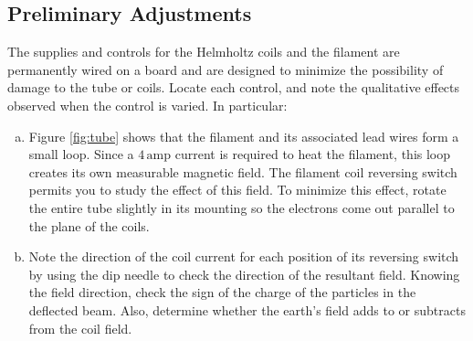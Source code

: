 \subsection{Preliminary Adjustments}
The supplies and controls for the Helmholtz coils and the filament are permanently wired on a board and are designed to minimize the possibility of damage to the tube or coils. Locate each control, and note the qualitative effects observed when the control is varied. In particular:
\begin{enumerate}[(a)]
\item Figure {\ref{fig:tube}} shows that the filament and its associated lead wires form a small loop. Since a $4\,\mathrm{amp}$ current is required to heat the filament, this loop creates its own measurable magnetic field. The filament coil reversing switch permits you to study the effect of this field. To minimize this effect, rotate the entire tube slightly in its mounting so the electrons come out parallel to the plane of the coils.
\item Note the direction of the coil current for each position of its reversing switch by using the dip needle to check the direction of the resultant field. Knowing the field direction, check the sign of the charge of the particles in the deflected beam. Also, determine whether the earth's field adds to or subtracts from the coil field.
\end{enumerate}

